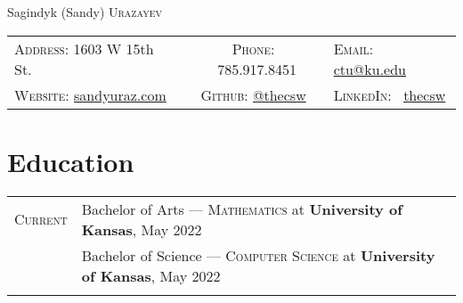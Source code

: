 \documentclass[letterpaper, 10pt]{article}
\begin{document}
\pagestyle{empty}

\par{\centering
	{\Huge Sagindyk (Sandy) \textsc{Urazayev}
	}\smallskip\par}

\begin{center}
	\begin{tabular}{lcl}
		\textsc{Address:}   1603 W 15th St.                              &
		\textsc{Phone:} \quad \ 785.917.8451                             &
		\textsc{Email:} \quad \href{mailto:ctu@ku.edu}{ctu@ku.edu}         \\

		\textsc{Website:} \href{https://sandyuraz.com}{sandyuraz.com}    &
		\textsc{Github:} \quad \href{https://github.com/thecsw}{@thecsw} &
		\textsc{LinkedIn:} \ \href{https://linkedin.com/in/thecsw}{thecsw} \\
	\end{tabular}
\end{center}

\section{Education}
\begin{tabular}{rl}
	\textsc{Current} & Bachelor of Arts --- \textsc{Mathematics} at \normalsize\textbf{University of Kansas}, May 2022         \\
	                 & Bachelor of Science --- \textsc{Computer Science} at \normalsize\textbf{University of Kansas}, May 2022 \\
	\\
\end{tabular}
\end{document}
